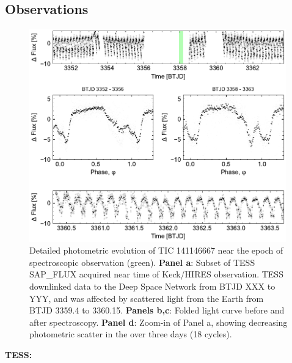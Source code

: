 \documentclass{nature3}
\begin{document}

\newpage
\begin{methods}

\renewcommand{\figurename}{Extended Data Figure}
\renewcommand{\tablename}{Extended Data Table}
\setcounter{table}{0}  
\setcounter{figure}{0}  


\subsection{Observations}

\begin{figure}[!b]
  \centering
  \includegraphics[width=0.99\textwidth]{figures/sf1.pdf}
  \caption{Detailed photometric evolution of TIC 141146667 near the
  epoch of spectroscopic observation (green). 
  {\bf Panel a}: Subset of TESS SAP\_FLUX acquired near time of
  Keck/HIRES observation.
  TESS downlinked data to the Deep Space Network from BTJD XXX to
  YYY, and was affected by scattered light from the Earth from BTJD
  3359.4 to 3360.15.
  {\bf Panels b,c}: Folded light curve before and after spectroscopy.
  {\bf Panel d}: Zoom-in of Panel a, showing decreasing photometric
  scatter in the over three days (18 cycles).
  }
  \label{fig:fulllc}
\end{figure}

{\bf TESS:}


\end{methods}
\end{document}

